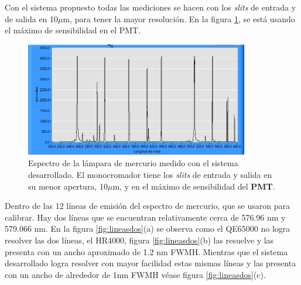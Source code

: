Con el sistema propuesto todas las mediciones se hacen con los \textit{slits} de entrada y de salida en 10$\mu$m, para tener la mayor resolución.  En la figura \ref{fig:spectra100}, se está usando el máximo de sensibilidad en el PMT.
\begin{figure}[h!]
	\centering
	\includegraphics[width=0.9\linewidth, height=5cm]{Imagenes/4/spectra100}
	\caption{Espectro de la lámpara de mercurio medido con el sistema desarrollado. El monocromador tiene los \textit{slits} de entrada y salida en su menor apertura, 10$\mu$m, y en el máximo de sensibilidad del \textbf{PMT}.}
	\label{fig:spectra100}
\end{figure}
Dentro de las 12 líneas de emisión del espectro de mercurio, que se usaron para calibrar. Hay dos líneas que se encuentran relativamente cerca de 576.96 nm y 579.066 nm. En la figura \ref{fig:lineasdos}(a) se observa como el QE65000 no logra resolver las dos líneas, el HR4000, figura \ref{fig:lineasdos}(b) las resuelve y las presenta con un ancho aproximado de 1.2 nm FWMH. Mientras que el sistema desarrollado logra resolver con mayor facilidad estas mismas líneas y las presenta con un ancho de alrededor de 1nm FWMH véase figura \ref{fig:lineasdos}(c). 

